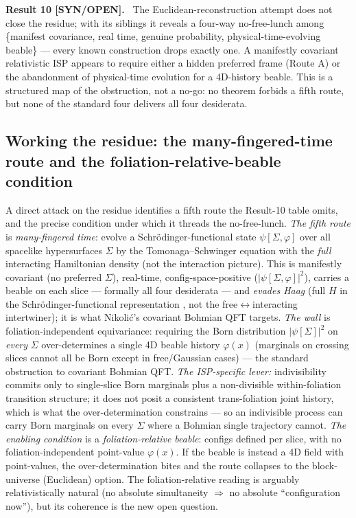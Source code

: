 \documentclass[aps,prd,preprint,amsmath,amssymb,nofootinbib,superscriptaddress]{revtex4-2}
\newenvironment{result}[1]{\par\medskip\noindent\textbf{#1}\ }{\par\medskip}
\begin{document}
\begin{result}{Result 10 [SYN/OPEN].}
The Euclidean-reconstruction attempt does not close the residue; with its siblings it reveals a
four-way no-free-lunch among \{manifest covariance, real time, genuine probability,
physical-time-evolving beable\} --- every known construction drops exactly one. A manifestly
covariant relativistic ISP appears to require either a hidden preferred frame (Route A) or the
abandonment of physical-time evolution for a 4D-history beable. This is a structured map of the
obstruction, not a no-go: no theorem forbids a fifth route, but none of the standard four
delivers all four desiderata.
\end{result}

\subsection{Working the residue: the many-fingered-time route and the foliation-relative-beable condition}
A direct attack on the residue identifies a fifth route the Result-10 table omits, and the
precise condition under which it threads the no-free-lunch. \emph{The fifth route} is
\emph{many-fingered time}: evolve a Schr\"odinger-functional state $\psi[\Sigma,\varphi]$ over
all spacelike hypersurfaces $\Sigma$ by the Tomonaga--Schwinger equation with the \emph{full}
interacting Hamiltonian density (not the interaction picture). This is manifestly covariant (no
preferred $\Sigma$), real-time, config-space-positive ($|\psi[\Sigma,\varphi]|^2$), carries a
beable on each slice --- formally all four desiderata --- and \emph{evades Haag} (full $H$ in the
Schr\"odinger-functional representation \cite{Symanzik1981}, not the free$\leftrightarrow$interacting
intertwiner); it is what Nikoli\'c's covariant Bohmian QFT \cite{Nikolic2006} targets. \emph{The
wall} is foliation-independent equivariance: requiring the Born distribution $|\psi[\Sigma]|^2$ on
\emph{every} $\Sigma$ over-determines a single 4D beable history $\varphi(x)$ (marginals on crossing
slices cannot all be Born except in free/Gaussian cases) --- the standard obstruction to covariant
Bohmian QFT. \emph{The ISP-specific lever:} indivisibility commits only to single-slice Born
marginals plus a non-divisible within-foliation transition structure; it does not posit a consistent
trans-foliation joint history, which is what the over-determination constrains --- so an indivisible
process can carry Born marginals on every $\Sigma$ where a Bohmian single trajectory cannot. \emph{The
enabling condition} is a \emph{foliation-relative beable}: configs defined per slice, with no
foliation-independent point-value $\varphi(x)$. If the beable is instead a 4D field with point-values,
the over-determination bites and the route collapses to the block-universe (Euclidean) option. The
foliation-relative reading is arguably relativistically natural (no absolute simultaneity $\Rightarrow$
no absolute ``configuration now''), but its coherence is the new open question.
\end{document}
